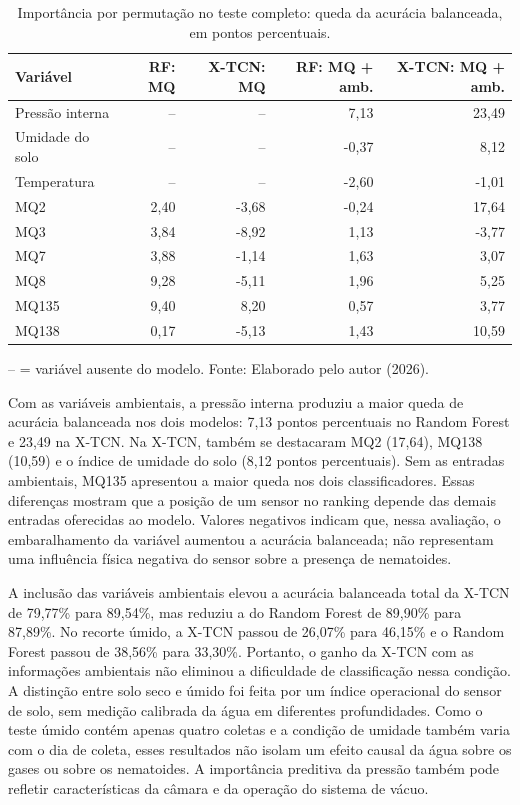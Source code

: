 \begin{table}[htbp]
    \centering
    \caption{Importância por permutação no teste completo: queda da acurácia balanceada, em pontos percentuais.}
    \label{tab:importancia_variaveis_vacuo}
    \scriptsize
    \begin{tabular}{lrrrr}
        \hline
        \textbf{Variável} &
        \textbf{RF: MQ} &
        \textbf{X-TCN: MQ} &
        \textbf{RF: MQ + amb.} &
        \textbf{X-TCN: MQ + amb.} \\
        \hline
        Pressão interna & --    & --    & 7,13  & 23,49 \\
        Umidade do solo & --    & --    & -0,37 & 8,12  \\
        Temperatura     & --    & --    & -2,60 & -1,01 \\
        MQ2             & 2,40  & -3,68 & -0,24 & 17,64 \\
        MQ3             & 3,84  & -8,92 & 1,13  & -3,77 \\
        MQ7             & 3,88  & -1,14 & 1,63  & 3,07  \\
        MQ8             & 9,28  & -5,11 & 1,96  & 5,25  \\
        MQ135           & 9,40  & 8,20  & 0,57  & 3,77  \\
        MQ138           & 0,17  & -5,13 & 1,43  & 10,59 \\
        \hline
    \end{tabular}

    \vspace{0.1cm}
    {\footnotesize -- = variável ausente do modelo. Fonte: Elaborado pelo autor (2026).}
\end{table}

Com as variáveis ambientais, a pressão interna produziu a maior queda de
acurácia balanceada nos dois modelos: 7,13 pontos percentuais no Random Forest
e 23,49 na X-TCN. Na X-TCN, também se destacaram MQ2 (17,64), MQ138 (10,59)
e o índice de umidade do solo (8,12 pontos percentuais). Sem as entradas
ambientais, MQ135 apresentou a maior queda nos dois classificadores. Essas
diferenças mostram que a posição de um sensor no ranking depende das demais
entradas oferecidas ao modelo. Valores negativos indicam que, nessa avaliação,
o embaralhamento da variável aumentou a acurácia balanceada; não representam
uma influência física negativa do sensor sobre a presença de nematoides.

A inclusão das variáveis ambientais elevou a acurácia balanceada total da
X-TCN de 79,77\% para 89,54\%, mas reduziu a do Random Forest de 89,90\% para
87,89\%. No recorte úmido, a X-TCN passou de 26,07\% para 46,15\% e o Random
Forest passou de 38,56\% para 33,30\%. Portanto, o ganho da X-TCN com as
informações ambientais não eliminou a dificuldade de classificação nessa
condição. A distinção entre solo seco e úmido foi feita por um índice
operacional do sensor de solo, sem medição calibrada da água em diferentes
profundidades. Como o teste úmido contém apenas quatro coletas e a condição de
umidade também varia com o dia de coleta, esses resultados não isolam um efeito
causal da água sobre os gases ou sobre os nematoides. A importância preditiva
da pressão também pode refletir características da câmara e da operação do
sistema de vácuo.
